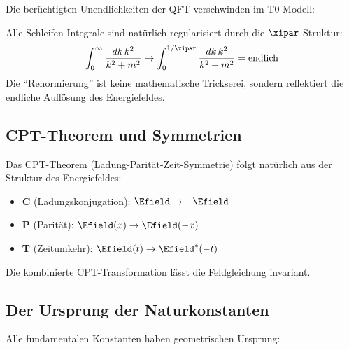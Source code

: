 	Die berüchtigten Unendlichkeiten der QFT verschwinden im T0-Modell:
	
	\begin{quantum}
		Alle Schleifen-Integrale sind natürlich regularisiert durch die $\xipar$-Struktur:
		\begin{equation}
			\int_0^\infty \frac{dk \, k^2}{k^2 + m^2} \rightarrow \int_0^{1/\xipar} \frac{dk \, k^2}{k^2 + m^2} = \text{endlich}
		\end{equation}
		Die ``Renormierung'' ist keine mathematische Trickserei, sondern reflektiert die endliche Auflösung des Energiefeldes.
	\end{quantum}
	
	\subsection{CPT-Theorem und Symmetrien}
	
	Das CPT-Theorem (Ladung-Parität-Zeit-Symmetrie) folgt natürlich aus der Struktur des Energiefeldes:
	
	\begin{itemize}
		\item \textbf{C} (Ladungskonjugation): $\Efield \rightarrow -\Efield$
		\item \textbf{P} (Parität): $\Efield(x) \rightarrow \Efield(-x)$
		\item \textbf{T} (Zeitumkehr): $\Efield(t) \rightarrow \Efield^*(-t)$
	\end{itemize}
	
	Die kombinierte CPT-Transformation lässt die Feldgleichung invariant.
	
	\subsection{Der Ursprung der Naturkonstanten}
	
	Alle fundamentalen Konstanten haben geometrischen Ursprung:
	
	\begin{table}[H]
		\centering
		\caption{Geometrischer Ursprung der Naturkonstanten}
	\end{table}
	

